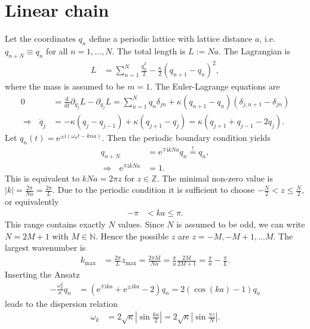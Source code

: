 \documentclass[english, parskip=full]{scrartcl}
\newcommand{\kla}{}
\newcommand{\tecxt}{}
\def\I{\text{i}}
\def\e{\text{e}}
\begin{document}
\section{Linear chain}
Let the coordinates $q_n$ define a periodic lattice with lattice distance $a$, i.e. $q_{n+N}\equiv q_n$ for all $n=1,\dots,N$.
The total length is $L:=Na$.
The Lagrangian is
\begin{align}
L&=\sum_{n=1}^N\frac{\dot{q}_n^2}{2}-\frac{\kappa}{2}(q_{n+1}-q_n)^2,
\end{align}
where the mass is assumed to be $m=1$.
The Euler-Lagrange equations are 
\begin{align}
0&=\frac{\tecxt\text{d}}{\tecxt\text{d}t}\partial_{\dot{q}_j}L-\partial_{q_j}L=\sum_{n=1}^N\ddot{q}_n\delta_{jn}+\kappa (q_{n+1}-q_n)(\delta_{j,n+1}-\delta_{jn})\\
\Rightarrow\ \ \ \ddot{q}_j&=-\kappa (q_j-q_{j-1})+\kappa (q_{j+1}-q_j)=\kappa (q_{j+1}+q_{j-1}-2q_j).
\end{align}
Let $q_n(t)=\e^{\pm\I (\omega_kt-kna)}$.
Then the periodic boundary condition yields
\begin{align}
q_{n+N}&=\e^{\mp\I kNa}q_n\overset{!}{=}q_n,\\
\Rightarrow\ \ \ \e^{\mp\I kNa}&=1.
\end{align}
This is equivalent to $kNa=2\pi z$ for $z\in\mathbb{Z}$.
The minimal non-zero value is $|k|=\frac{2\pi}{Na}=\frac{2\pi}{L}$.
Due to the periodic condition it is sufficient to choose $-\frac{N}{2}<z\le\frac{N}{2}$, or equivalently
\begin{align}
-\pi &< ka\le \pi.
\end{align}
This range contains exactly $N$ values. 
Since $N$ is assumed to be odd, we can write $N=2M+1$ with $M\in\mathbb{N}$.
Hence the possible $z$ are $z=-M,-M+1,\dots M$.
The largest wavenumber is 
\begin{align}
k_\tecxt\text{max}&=\frac{2\pi}{L}z_\tecxt\text{max}=\frac{2\pi M}{Na}=\frac{\pi}{a}\frac{2M}{2M+1}=\frac{\pi}{a}-\frac{\pi}{L}.
\end{align}
Inserting the Ansatz
\begin{align}
-\frac{\omega_k^2}{\kappa}q_n&=\kla\left( {\e^{\mp\I ka}+\e^{\pm\I ka}-2} \right)q_n=2\kla\left( {\cos (ka)-1} \right)q_n
\end{align} 
leads to the dispersion relation
\begin{align}
\omega_k&=2\sqrt{\kappa}\left\vert\sin\frac{ka}{2}\right\vert=2\sqrt{\kappa}\left\vert\sin\frac{\pi z}{N}\right\vert.
\end{align}
\end{document}
